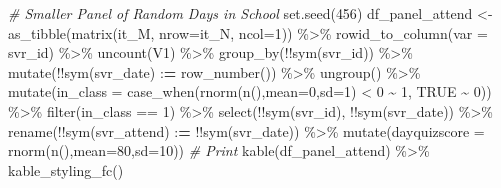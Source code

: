\documentclass[
]{book}
\newenvironment{Shaded}{\begin{snugshade}}{\end{snugshade}}
\newcommand{\AttributeTok}[1]{\textcolor[rgb]{0.77,0.63,0.00}{#1}}
\newcommand{\CommentTok}[1]{\textcolor[rgb]{0.56,0.35,0.01}{\textit{#1}}}
\newcommand{\ConstantTok}[1]{\textcolor[rgb]{0.00,0.00,0.00}{#1}}
\newcommand{\DecValTok}[1]{\textcolor[rgb]{0.00,0.00,0.81}{#1}}
\newcommand{\ErrorTok}[1]{\textcolor[rgb]{0.64,0.00,0.00}{\textbf{#1}}}
\newcommand{\FunctionTok}[1]{\textcolor[rgb]{0.00,0.00,0.00}{#1}}
\newcommand{\NormalTok}[1]{#1}
\newcommand{\OtherTok}[1]{\textcolor[rgb]{0.56,0.35,0.01}{#1}}
\newcommand{\SpecialCharTok}[1]{\textcolor[rgb]{0.00,0.00,0.00}{#1}}
\begin{document}
\begin{Shaded}
\begin{Highlighting}[]
\CommentTok{\# Smaller Panel of Random Days in School}
\FunctionTok{set.seed}\NormalTok{(}\DecValTok{456}\NormalTok{)}
\NormalTok{df\_panel\_attend }\OtherTok{\textless{}{-}} \FunctionTok{as\_tibble}\NormalTok{(}\FunctionTok{matrix}\NormalTok{(it\_M, }\AttributeTok{nrow=}\NormalTok{it\_N, }\AttributeTok{ncol=}\DecValTok{1}\NormalTok{)) }\SpecialCharTok{\%\textgreater{}\%}
  \FunctionTok{rowid\_to\_column}\NormalTok{(}\AttributeTok{var =}\NormalTok{ svr\_id) }\SpecialCharTok{\%\textgreater{}\%}
  \FunctionTok{uncount}\NormalTok{(V1) }\SpecialCharTok{\%\textgreater{}\%}
  \FunctionTok{group\_by}\NormalTok{(}\SpecialCharTok{!!}\FunctionTok{sym}\NormalTok{(svr\_id)) }\SpecialCharTok{\%\textgreater{}\%} \FunctionTok{mutate}\NormalTok{(}\SpecialCharTok{!!}\FunctionTok{sym}\NormalTok{(svr\_date) }\SpecialCharTok{:}\ErrorTok{=} \FunctionTok{row\_number}\NormalTok{()) }\SpecialCharTok{\%\textgreater{}\%}
  \FunctionTok{ungroup}\NormalTok{() }\SpecialCharTok{\%\textgreater{}\%} \FunctionTok{mutate}\NormalTok{(}\AttributeTok{in\_class =} \FunctionTok{case\_when}\NormalTok{(}\FunctionTok{rnorm}\NormalTok{(}\FunctionTok{n}\NormalTok{(),}\AttributeTok{mean=}\DecValTok{0}\NormalTok{,}\AttributeTok{sd=}\DecValTok{1}\NormalTok{) }\SpecialCharTok{\textless{}} \DecValTok{0} \SpecialCharTok{\textasciitilde{}} \DecValTok{1}\NormalTok{, }\ConstantTok{TRUE} \SpecialCharTok{\textasciitilde{}} \DecValTok{0}\NormalTok{)) }\SpecialCharTok{\%\textgreater{}\%}
  \FunctionTok{filter}\NormalTok{(in\_class }\SpecialCharTok{==} \DecValTok{1}\NormalTok{) }\SpecialCharTok{\%\textgreater{}\%} \FunctionTok{select}\NormalTok{(}\SpecialCharTok{!!}\FunctionTok{sym}\NormalTok{(svr\_id), }\SpecialCharTok{!!}\FunctionTok{sym}\NormalTok{(svr\_date)) }\SpecialCharTok{\%\textgreater{}\%}
  \FunctionTok{rename}\NormalTok{(}\SpecialCharTok{!!}\FunctionTok{sym}\NormalTok{(svr\_attend) }\SpecialCharTok{:}\ErrorTok{=} \SpecialCharTok{!!}\FunctionTok{sym}\NormalTok{(svr\_date)) }\SpecialCharTok{\%\textgreater{}\%}
  \FunctionTok{mutate}\NormalTok{(}\AttributeTok{dayquizscore =} \FunctionTok{rnorm}\NormalTok{(}\FunctionTok{n}\NormalTok{(),}\AttributeTok{mean=}\DecValTok{80}\NormalTok{,}\AttributeTok{sd=}\DecValTok{10}\NormalTok{))}
\CommentTok{\# Print}
\FunctionTok{kable}\NormalTok{(df\_panel\_attend) }\SpecialCharTok{\%\textgreater{}\%}
  \FunctionTok{kable\_styling\_fc}\NormalTok{()}
\end{Highlighting}
\end{Shaded}
\end{document}
